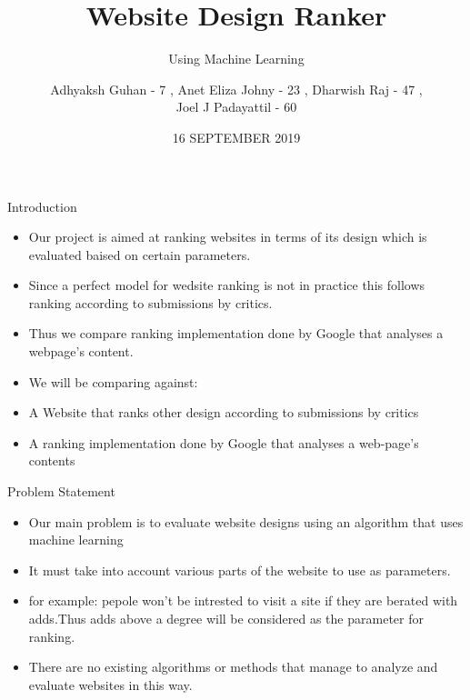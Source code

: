 \documentclass[11pt]{beamer}
\begin{document}
	\title{\textbf{Website Design Ranker}}
	\subtitle{Using Machine Learning}
	\date{16 SEPTEMBER 2019}
	\author{{\scriptsize Adhyaksh Guhan - 7 , Anet Eliza Johny - 23 , Dharwish Raj - 47 , \\ Joel J Padayattil - 60}}
	\begin{frame}[plain]
		\maketitle
	\end{frame}
	\begin{frame}{Introduction}
		\begin{itemize}
			
			
			\item Our project is aimed at ranking websites in terms of its design which is evaluated baised on certain parameters.
			
			\item Since a perfect model for wedsite ranking  is not in practice this  follows ranking according to submissions by critics.
			
			\item Thus we compare ranking implementation done by Google that analyses a webpage's content.
		
			\item We will be comparing against:
				\item A Website that ranks other design according to submissions by critics
				\item A ranking implementation done by Google that analyses a web-page's contents
		\end{itemize}
	\end{frame}
	\begin{frame}{Problem Statement}
		\begin{itemize}

			\item Our main problem is to evaluate website designs using an algorithm that uses machine learning
			
			\item It must take into account various parts of the website to use as parameters.
			
			\item for example: pepole won't be intrested to visit a site if they are berated with adds.Thus adds above a degree will be considered as the parameter for ranking.

			\item There are no existing algorithms or methods that manage to analyze and evaluate websites in this way.
		\end{itemize}
	\end{frame}
\end{document}
